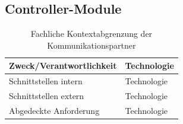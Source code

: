 \subsection{Controller-Module}
\begin{table}[th]
	\begin{tabularx}{\textwidth}{X X}
		\hline
		Zweck/Verantwortlichkeit & Technologie \\
		\hline
		Schnittstellen intern & Technologie \\
		\hline
		Schnittstellen extern & Technologie \\
		\hline
		Abgedeckte Anforderung & Technologie \\
		\hline
	\end{tabularx} 
	\caption{Fachliche Kontextabgrenzung der Kommunikationspartner}
	\label{tab:FachlicheKontextabgrenzungDerKommunikationspartner}
\end{table}
